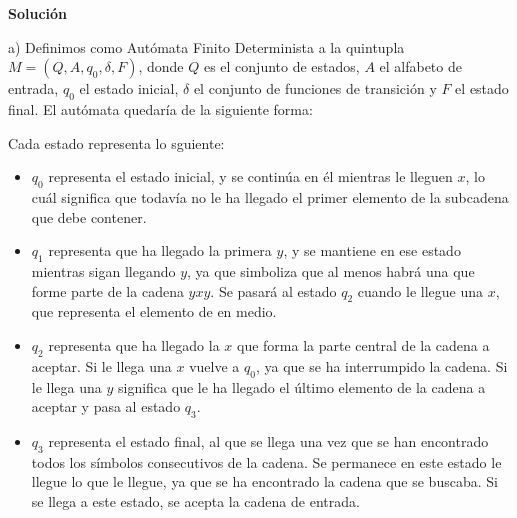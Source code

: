 \documentclass[11pt,a4paper]{article}
\newcommand{\sol}{\textbf{Solución}}
\begin{document}
		\sol \par
		a) Definimos como Autómata Finito Determinista a la quintupla $M = (Q, A, q_0, \delta, F)$, donde $Q$ es
		el conjunto de estados, $A$ el alfabeto de entrada, $q_0$ el estado inicial, $\delta$ el conjunto de funciones
		de transición y $F$ el estado final. El autómata quedaría de la siguiente forma:
		
		\begin{center}
		\end{center}
		
		Cada estado representa lo sguiente:
		
		\begin{itemize}
			\item $q_0$ representa el estado inicial, y se continúa en él mientras le lleguen $x$, lo cuál significa
			que todavía no le ha llegado el primer elemento de la subcadena que debe contener.
			\item $q_1$ representa que ha llegado la primera $y$, y se mantiene en ese estado mientras sigan llegando
			$y$, ya que simboliza que al menos habrá una que forme parte de la cadena $yxy$. Se pasará al estado 
			$q_2$ cuando le llegue una $x$, que representa el elemento de en medio.
			\item $q_2$ representa que ha llegado la $x$ que forma la parte central de la cadena a aceptar. Si le llega
			una $x$ vuelve a $q_0$, ya que se ha interrumpido la cadena. Si le llega una $y$ significa que le ha llegado
			el último elemento de la cadena a aceptar y pasa al estado $q_3$.
			\item $q_3$ representa el estado final, al que se llega una vez que se han encontrado todos los símbolos
			consecutivos de la cadena. Se permanece en este estado le llegue lo que le llegue, ya que se ha encontrado
			la cadena que se buscaba. Si se llega a este estado, se acepta la cadena de entrada.
		\end{itemize}
		
\end{document}
